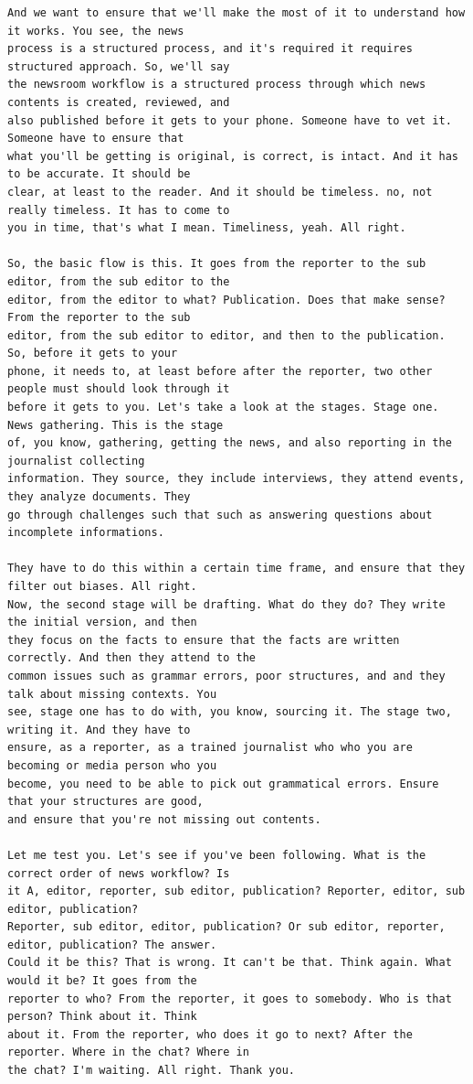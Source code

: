 {\begin{Verbatim}
And we want to ensure that we'll make the most of it to understand how it works. You see, the news
process is a structured process, and it's required it requires structured approach. So, we'll say
the newsroom workflow is a structured process through which news contents is created, reviewed, and
also published before it gets to your phone. Someone have to vet it. Someone have to ensure that
what you'll be getting is original, is correct, is intact. And it has to be accurate. It should be
clear, at least to the reader. And it should be timeless. no, not really timeless. It has to come to
you in time, that's what I mean. Timeliness, yeah. All right.

So, the basic flow is this. It goes from the reporter to the sub editor, from the sub editor to the
editor, from the editor to what? Publication. Does that make sense? From the reporter to the sub
editor, from the sub editor to editor, and then to the publication. So, before it gets to your
phone, it needs to, at least before after the reporter, two other people must should look through it
before it gets to you. Let's take a look at the stages. Stage one. News gathering. This is the stage
of, you know, gathering, getting the news, and also reporting in the journalist collecting
information. They source, they include interviews, they attend events, they analyze documents. They
go through challenges such that such as answering questions about incomplete informations.

They have to do this within a certain time frame, and ensure that they filter out biases. All right.
Now, the second stage will be drafting. What do they do? They write the initial version, and then
they focus on the facts to ensure that the facts are written correctly. And then they attend to the
common issues such as grammar errors, poor structures, and and they talk about missing contexts. You
see, stage one has to do with, you know, sourcing it. The stage two, writing it. And they have to
ensure, as a reporter, as a trained journalist who who you are becoming or media person who you
become, you need to be able to pick out grammatical errors. Ensure that your structures are good,
and ensure that you're not missing out contents.

Let me test you. Let's see if you've been following. What is the correct order of news workflow? Is
it A, editor, reporter, sub editor, publication? Reporter, editor, sub editor, publication?
Reporter, sub editor, editor, publication? Or sub editor, reporter, editor, publication? The answer.
Could it be this? That is wrong. It can't be that. Think again. What would it be? It goes from the
reporter to who? From the reporter, it goes to somebody. Who is that person? Think about it. Think
about it. From the reporter, who does it go to next? After the reporter. Where in the chat? Where in
the chat? I'm waiting. All right. Thank you.


\end{Verbatim}}
